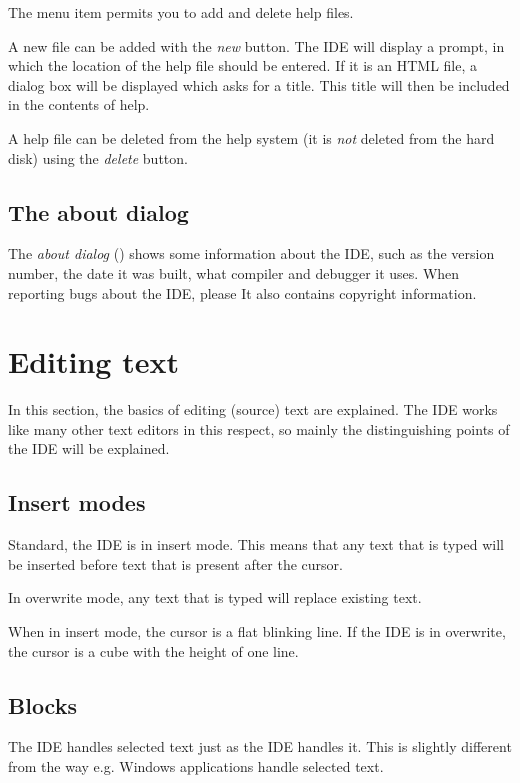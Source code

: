 The menu item  permits you to add and delete
help files.

A new file can be added with the \emph{new} button. The IDE will display
a prompt, in which the location of the help file should be entered.
If it is an HTML file, a dialog box will be displayed
which asks for a title. This title will then be included in the
contents of help.

A help file can be deleted from the help system (it is \emph{not} deleted 
from the hard disk) using the \emph{delete} button.

\subsection{The about dialog}
\label{se:about}
The \emph{about dialog} () shows some information
about the IDE, such as the version number, the date it was built, what
compiler and debugger it uses. When reporting bugs about the IDE, please 
It also contains copyright information.

\section{Editing text}
\label{se:editingtext}
In this section, the basics of editing (source) text are explained. The IDE
works like many other text editors in this respect, so mainly the
distinguishing points of the IDE will be explained.

\subsection{Insert modes}
Standard, the IDE is in insert mode. This means that any text that is typed
will be inserted before text that is present after the cursor. 

In overwrite mode, any text that is typed will replace existing text. 

When in insert mode, the cursor is a flat blinking line. If the IDE is in
overwrite, the cursor is a cube with the height of one line.
%
%
\subsection{Blocks}
\label{se:blocks}
The IDE handles selected text just as the \tp IDE handles it. This is
slightly different from the way e.g. Windows applications handle selected
text. 

